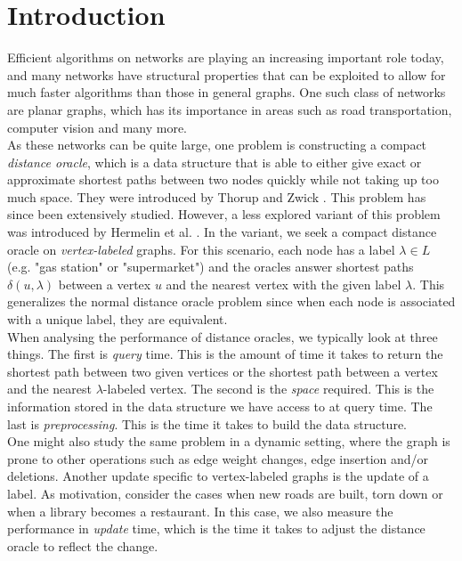 \section{Introduction}\label{introduction}
Efficient algorithms on networks are playing an increasing important role today, and many
networks have structural properties that can be exploited to allow for much faster
algorithms than those in general graphs. One such class of networks are planar graphs,
which has its importance in
areas such as road transportation, computer vision and many more. \\
As these networks can be quite large, one problem is constructing a compact \textit{distance
oracle}, which is a data structure that is able to either give exact or approximate
shortest paths between two nodes quickly while not taking up too much space. They were
introduced by Thorup and Zwick \cite{thorup2005approximate}. This problem has since been
extensively studied. However, a less explored variant of this problem
was introduced by Hermelin et al. \cite{hermelin2011distance}. In the variant, we seek a
compact distance oracle on \textit{vertex-labeled} graphs. For this scenario, each node
has a label $\lambda\in L$ (e.g. "gas
station" or "supermarket") and the oracles answer shortest paths $\delta(u,\lambda)$ between a
vertex $u$ and
the nearest vertex with the given label $\lambda$. This generalizes the normal distance oracle problem since when each node is
associated with a unique label, they are equivalent. \\
When analysing the performance of
distance oracles, we typically look at three things. The first is \textit{query} time.
This is the amount of time it takes to return the shortest path between two given
vertices or the shortest path between a vertex and the nearest $\lambda$-labeled vertex.
The second is the \textit{space} required. This is the information stored in the data
structure we have access to at query time. The last is \textit{preprocessing}. This is
the time it takes to build the data structure. \\
One might also study the same problem in a dynamic setting, where the graph is prone to
other operations such as edge weight changes, edge insertion and/or deletions. Another
update specific to vertex-labeled graphs is the update of a label. As motivation,
consider the cases when new roads are built, torn down or when a library
becomes a restaurant. In this case, we also measure the performance in \textit{update}
time, which is the time it takes to adjust the distance oracle to reflect the change.

